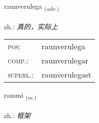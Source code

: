 \documentclass[frontgrid, backgrid]{flacards}\usepackage[]{graphicx}\usepackage[]{xcolor}
\begin{document}
\renewcommand{\blhead}{\vskip5pt {\small\bfseries\footnotesize Atviksorð | 副词 }}
\renewcommand{\bcfoot}{\vskip5pt \hspace{2pt}{\small\bfseries\footnotesize 3K}}


{raunverulega \small{\textsubscript{(\textit{adv.})}} \\[1ex] %
\textphonetic{[rœinvɛrʏlɛɣa]} \\
zh.: \emph{真的，实际上} \\  [2ex]
\renewcommand*{\arraystretch}{0.8}
\begin{tabular}{ll}
\textsc{pos}: & raunverulega \\ 
\textsc{comp.}: & raunverulegar \\ 
\textsc{superl.}: & raunverulegast \\
\end{tabular}
}

\renewcommand{\flhead}{\vskip5pt \fboxsep=0pt {\small\bfseries\footnotesize Nafnorð | 名词}}
\renewcommand{\fcfoot}{\vskip5pt \fboxsep=0pt \hspace{2pt}{\small\bfseries\footnotesize 3K}}

\renewcommand{\blhead}{\vskip5pt {\small\bfseries\footnotesize Nafnorð | 名词 }}
\renewcommand{\bcfoot}{\vskip5pt \hspace{2pt}{\small\bfseries\footnotesize 3K}}


{rammi \small{\textsubscript{(\textit{m.})}} \\[1ex] %
\textphonetic{[ramɪ]} \\
zh.: \emph{框架} \\  [2ex]
\renewcommand*{\arraystretch}{0.8}
}

\renewcommand{\flhead}{\vskip5pt \fboxsep=0pt {\small\bfseries\footnotesize Nafnorð | 名词}}
\renewcommand{\fcfoot}{\vskip5pt \fboxsep=0pt \hspace{2pt}{\small\bfseries\footnotesize 3K}}
\end{document}

